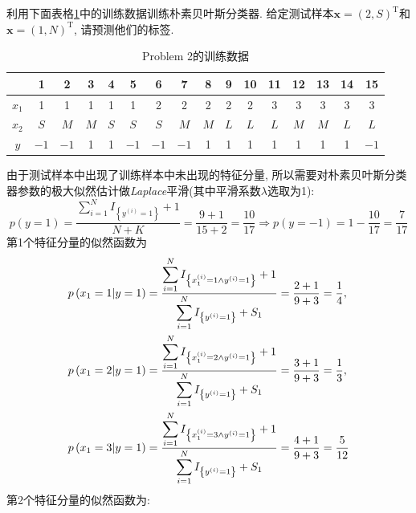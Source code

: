 \documentclass{article}
\begin{document}
\pagebreak

\begin{homeworkProblem}
	利用下面表格\ref{tabel:Traindata}中的训练数据训练朴素贝叶斯分类器. 给定测试样本$\boldsymbol{x}=(2,S)^{\text{T}}$和$\boldsymbol{x}=(1,N)^{\text{T}}$, 请预测他们的标签.
	\begin{table}[H]
		\centering
		\caption{Problem 2的训练数据}
		\label{tabel:Traindata}
		\begin{tabular}{c|ccccccccccccccc}
		\hline
		& 1   & 2   & 3   & 4   & 5  & 6  & 7  & 8 & 9 & 10 & 11 & 12 & 13 & 14 & 15 \\ \hline
		$x_1$ & 1   & 1   & 1   & 1   & 1  & 2  & 2  & 2 & 2 & 2  & 3  & 3  & 3  & 3  & 3  \\ \hline
		$x_2$ & $S$ & $M$ & $M$ & $S$ & $S$  & $S$  & $M$  & $M$ & $L$ & $L$  & $L$  & $M$  & $M$  & $L$  & $L$  \\ \hline
		$y$     & $-1$  & $-1$  & 1   & 1   & $-1$ & $-1$ & $-1$ & 1 & 1 & 1  & 1  & 1  & 1  & 1  & $-1$ \\ \hline
		\end{tabular}
	\end{table}
	由于测试样本中出现了训练样本中未出现的特征分量, 所以需要对朴素贝叶斯分类器参数的极大似然估计做\textit{Laplace}平滑(其中平滑系数$\lambda$选取为1):
	$$
	p\left( y=1 \right) =\frac{\displaystyle \sum_{i=1}^N{I_{\left\{ y^{\left( i \right)}=1 \right\}}}+1}{N+K}=\frac{9+1}{15+2}=\frac{10}{17}\Rightarrow p\left( y=-1 \right) =1-\frac{10}{17}=\frac{7}{17}
	$$
	第1个特征分量的似然函数为
	\begin{align}
		p\left( x_1=1|y=1 \right) &=\frac{\displaystyle \sum_{i=1}^N{I_{\left\{ x_{1}^{\left( i \right)}=1\land y^{\left( i \right)}=1 \right\}}}+1}{\displaystyle \sum_{i=1}^N{I_{\left\{ y^{\left( i \right)}=1 \right\}}}+S_1}=\frac{2+1}{9+3}=\frac{1}{4}, \notag
		\\
		p\left( x_1=2|y=1 \right) &=\frac{\displaystyle \sum_{i=1}^N{I_{\left\{ x_{1}^{\left( i \right)}=2\land y^{\left( i \right)}=1 \right\}}}+1}{\displaystyle \sum_{i=1}^N{I_{\left\{ y^{\left( i \right)}=1 \right\}}}+S_1}=\frac{3+1}{9+3}=\frac{1}{3}, \notag
		\\
		p\left( x_1=3|y=1 \right) &=\frac{\displaystyle \sum_{i=1}^N{I_{\left\{ x_{1}^{\left( i \right)}=3\land y^{\left( i \right)}=1 \right\}}}+1}{\displaystyle \sum_{i=1}^N{I_{\left\{ y^{\left( i \right)}=1 \right\}}}+S_1}=\frac{4+1}{9+3}=\frac{5}{12} \notag
	\end{align}
	第2个特征分量的似然函数为:
	\begin{align}

\end{align}
\end{homeworkProblem}
\end{document}
